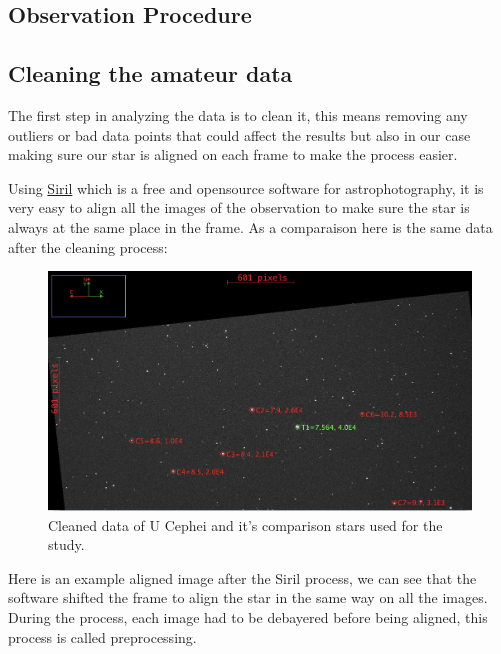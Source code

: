 \documentclass[12pt,a4paper]{article}
\begin{document}
\subsection{Observation Procedure}

\subsection{Cleaning the amateur data}


The first step in analyzing the data is to clean it, this means removing any outliers or bad data points that could affect the results but also in our case making sure our star is aligned on each frame to make the process easier.

\bigskip


Using \href{https://siril.org/fr/}{Siril} which is a free and opensource software for astrophotography, it is very easy to align all the images of the observation to make sure the star is always at the same place in the frame.
As a comparaison here is the same data after the cleaning process:

\begin{figure}[H]
    \centering
    \includegraphics[width=1\textwidth]{assets/aligned.png}
    \caption{Cleaned data of U Cephei and it's comparison stars used for the study.}
    \label{fig:cleaned_data}
\end{figure}

Here is an example aligned image after the Siril process, we can see that the software shifted
the frame to align the star in the same way on all the images. During the process,
each image had to be debayered before being aligned, this process is called preprocessing.
\end{document}
